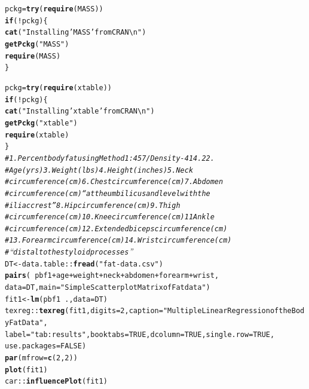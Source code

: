 \documentclass[11pt,letter]{article}\usepackage[]{graphicx}\usepackage[]{color}
\makeatletter
\newcommand{\hlnum}[1]{\textcolor[rgb]{0.686,0.059,0.569}{#1}}%
\newcommand{\hlstr}[1]{\textcolor[rgb]{0.192,0.494,0.8}{#1}}%
\newcommand{\hlcom}[1]{\textcolor[rgb]{0.678,0.584,0.686}{\textit{#1}}}%
\newcommand{\hlopt}[1]{\textcolor[rgb]{0,0,0}{#1}}%
\newcommand{\hlstd}[1]{\textcolor[rgb]{0.345,0.345,0.345}{#1}}%
\newcommand{\hlkwa}[1]{\textcolor[rgb]{0.161,0.373,0.58}{\textbf{#1}}}%
\newcommand{\hlkwb}[1]{\textcolor[rgb]{0.69,0.353,0.396}{#1}}%
\newcommand{\hlkwc}[1]{\textcolor[rgb]{0.333,0.667,0.333}{#1}}%
\newcommand{\hlkwd}[1]{\textcolor[rgb]{0.737,0.353,0.396}{\textbf{#1}}}%
\newenvironment{kframe}{%
 \def\at@end@of@kframe{}%
 \ifinner\ifhmode%
  \def\at@end@of@kframe{\end{minipage}}%
  \begin{minipage}{\columnwidth}%
 \fi\fi%
 \def\FrameCommand##1{\hskip\@totalleftmargin \hskip-\fboxsep
 \colorbox{shadecolor}{##1}\hskip-\fboxsep
     \hskip-\linewidth \hskip-\@totalleftmargin \hskip\columnwidth}%
 \MakeFramed {\advance\hsize-\width
   \@totalleftmargin\z@ \linewidth\hsize
   \@setminipage}}%
 {\par\unskip\endMakeFramed%
 \at@end@of@kframe}
\newenvironment{knitrout}{}{} %
\makeatother
\begin{document}
\begin{knitrout}
\begin{kframe}
\begin{alltt}
\hlstd{pckg} \hlkwb{=} \hlkwd{try}\hlstd{(}\hlkwd{require}\hlstd{(MASS))}
\hlkwa{if} \hlstd{(}\hlopt{!}\hlstd{pckg) \{}
    \hlkwd{cat}\hlstd{(}\hlstr{"Installing 'MASS' from CRAN\textbackslash{}n"}\hlstd{)}
    \hlkwd{getPckg}\hlstd{(}\hlstr{"MASS"}\hlstd{)}
    \hlkwd{require}\hlstd{(MASS)}
\hlstd{\}}

\hlstd{pckg} \hlkwb{=} \hlkwd{try}\hlstd{(}\hlkwd{require}\hlstd{(xtable))}
\hlkwa{if} \hlstd{(}\hlopt{!}\hlstd{pckg) \{}
    \hlkwd{cat}\hlstd{(}\hlstr{"Installing 'xtable' from CRAN\textbackslash{}n"}\hlstd{)}
    \hlkwd{getPckg}\hlstd{(}\hlstr{"xtable"}\hlstd{)}
    \hlkwd{require}\hlstd{(xtable)}
\hlstd{\}}
\hlcom{# 1. Percent body fat using Method 1: 457/Density - 414.2 2.}
\hlcom{# Age (yrs) 3. Weight (lbs) 4. Height (inches) 5. Neck}
\hlcom{# circumference (cm) 6. Chest circumference (cm) 7. Abdomen}
\hlcom{# circumference (cm) “at the umbilicus and level with the}
\hlcom{# iliac crest” 8. Hip circumference (cm) 9. Thigh}
\hlcom{# circumference (cm) 10. Knee circumference (cm) 11 Ankle}
\hlcom{# circumference (cm) 12. Extended biceps circumference (cm)}
\hlcom{# 13. Forearm circumference (cm) 14. Wrist circumference (cm)}
\hlcom{# “distal to the styloid processes”}
\hlstd{DT} \hlkwb{<-} \hlstd{data.table}\hlopt{::}\hlkwd{fread}\hlstd{(}\hlstr{"fat-data.csv"}\hlstd{)}
\hlkwd{pairs}\hlstd{(}\hlopt{~}\hlstd{pbf1} \hlopt{+} \hlstd{age} \hlopt{+} \hlstd{weight} \hlopt{+} \hlstd{neck} \hlopt{+} \hlstd{abdomen} \hlopt{+} \hlstd{forearm} \hlopt{+} \hlstd{wrist,}
    \hlkwc{data} \hlstd{= DT,} \hlkwc{main} \hlstd{=} \hlstr{"Simple Scatterplot Matrix of Fat data"}\hlstd{)}
\hlstd{fit1} \hlkwb{<-} \hlkwd{lm}\hlstd{(pbf1} \hlopt{~} \hlstd{.,} \hlkwc{data} \hlstd{= DT)}
\hlstd{texreg}\hlopt{::}\hlkwd{texreg}\hlstd{(fit1,} \hlkwc{digits} \hlstd{=} \hlnum{2}\hlstd{,} \hlkwc{caption} \hlstd{=} \hlstr{"Multiple Linear Regression of the Body Fat Data"}\hlstd{,}
    \hlkwc{label} \hlstd{=} \hlstr{"tab:results"}\hlstd{,} \hlkwc{booktabs} \hlstd{=} \hlnum{TRUE}\hlstd{,} \hlkwc{dcolumn} \hlstd{=} \hlnum{TRUE}\hlstd{,} \hlkwc{single.row} \hlstd{=} \hlnum{TRUE}\hlstd{,}
    \hlkwc{use.packages} \hlstd{=} \hlnum{FALSE}\hlstd{)}
\hlkwd{par}\hlstd{(}\hlkwc{mfrow} \hlstd{=} \hlkwd{c}\hlstd{(}\hlnum{2}\hlstd{,} \hlnum{2}\hlstd{))}
\hlkwd{plot}\hlstd{(fit1)}
\hlstd{car}\hlopt{::}\hlkwd{influencePlot}\hlstd{(fit1)}



\end{alltt}
\end{kframe}
\end{knitrout}
\end{document}
